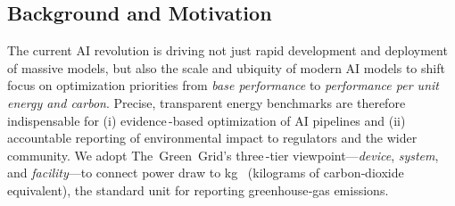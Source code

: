 \subsection{Background and Motivation}
\label{sec:energy:background}
The current AI revolution is driving not just rapid development and deployment of massive models, but also the scale and ubiquity of modern AI models to shift focus on optimization priorities from \emph{base performance} to \emph{performance \textit{per unit energy and carbon}}. Precise, transparent energy benchmarks are therefore indispensable for (i) evidence\,-based optimization of AI pipelines and (ii) accountable reporting of environmental impact to regulators and the wider community. We adopt The~Green~Grid's three\,-tier viewpoint—\emph{device}, \emph{system}, and \emph{facility}—to connect power draw to \si{\kilogram\COtwoe} (kilograms of carbon‑dioxide equivalent), the standard unit for reporting greenhouse‑gas emissions.



\newcommand{\headerfont}{\fontsize{10pt}{12pt}\selectfont\bfseries}

